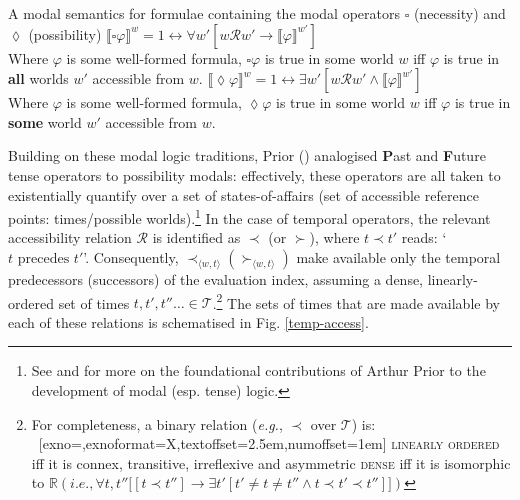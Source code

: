 \documentclass[11pt,dvipsnames]{report}
\providecommand{\denote}[2][]{\ensuremath{\llbracket{#2}\rrbracket^{#1}}}
\begin{document}
\pex A modal semantics for formulae containing the modal operators $ \square $ (necessity) and $ \lozenge $ (possibility)  
\a$ \denote[w]{\square\varphi} =1\leftrightarrow\forall w'[w\mathcal{R} w'\to\denote[w']{\varphi}] $\\
Where $ \varphi $ is some well-formed formula, $ \square\varphi $ is true in some world $ w $ iff $ \varphi $ is true in \textbf{all} worlds $ w' $ accessible from $ w $.
\a$  \denote[w]{\lozenge\varphi} =1\leftrightarrow\exists w'[w\mathcal{R} w'\wedge\denote[w']{\varphi}] $\\
Where $ \varphi $ is some well-formed formula, $ \lozenge\varphi $ is true in some world $ w $ iff $ \varphi $ is true in \textbf{some} world $ w' $ accessible from $ w $.
\xe


\noindent Building on these modal logic traditions, Prior (\citeyear{Prior1958,Prior1967,Prior1957}) analogised \textbf{P}ast and \textbf{F}uture tense operators to possibility modals: effectively, these operators are all taken to existentially quantify over a set of states-of-affairs (set of accessible reference points: times/possible worlds).\footnote{See \citet{Copeland2002,Copeland2020} and \citet{Markoska-Cubrinovska2016} for more on the foundational contributions of Arthur Prior to the development of modal (esp. tense) logic.} In the case of temporal operators, the relevant accessibility relation $ \mathcal R $ is identified as $ \prec $ (or $ \succ $), where $ t\prec t' $ reads: `$ t \text{ precedes }t' $'. Consequently, $ \prec_{\langle w,t\rangle} (\succ_{\langle w,t\rangle}) $ make available only the temporal predecessors (successors) of the evaluation index, assuming a dense, linearly-ordered set of times $ t,t',t''\hdots\in\mathcal T $.\footnote{
	For completeness, a binary relation (\textit{e.g.}, $ \prec $ over $ \mathcal T $) is:
\pex~[exno=,exnoformat=X,textoffset=2.5em,numoffset=1em] 
\a  \textsc{linearly ordered} iff it is connex, transitive, irreflexive and asymmetric
\a \textsc{dense} iff it is isomorphic to $ \mathbb R (\textit{i.e.}, \forall t,t''\big[[t\prec t'']\to\exists t'[t'\neq t\neq t''\wedge t\prec t'\prec t'']\big] )$
\xe	
	} 
The sets of times that are made available by each of these relations is schematised in Fig. \ref{temp-access}. 
\end{document}
